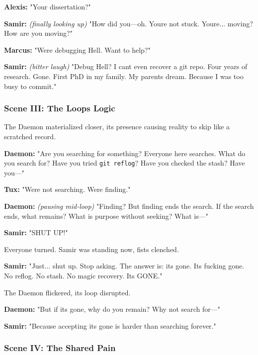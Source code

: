 \textbf{Alexis:} "Your dissertation?"

\textbf{Samir:} \emph{(finally looking up)} "How did you---oh. You\textquotesingle re not stuck. You\textquotesingle re... moving? How are you moving?"

\textbf{Marcus:} "We\textquotesingle re debugging Hell. Want to help?"

\textbf{Samir:} \emph{(bitter laugh)} "Debug Hell? I can\textquotesingle t even recover a git repo. Four years of research. Gone. First PhD in my family. My parents\textquotesingle{} dream. Because I was \textquotesingle too busy\textquotesingle{} to commit."

\bookdivider

\subsubsection{Scene III: The Loop\textquotesingle s Logic}\label{scene-iii-the-loops-logic}

The Daemon materialized closer, its presence causing reality to skip like a scratched record.

\textbf{Daemon:} "Are you searching for something? Everyone here searches. What do you search for? Have you tried \texttt{git\ reflog}? Have you checked the stash? Have you---"

\textbf{Tux:} "We\textquotesingle re not searching. We\textquotesingle re finding."

\textbf{Daemon:} \emph{(pausing mid-loop)} "Finding? But finding ends the search. If the search ends, what remains? What is purpose without seeking? What is---"

\textbf{Samir:} "SHUT UP!"

Everyone turned. Samir was standing now, fists clenched.

\textbf{Samir:} "Just... shut up. Stop asking. The answer is: it\textquotesingle s gone. It\textquotesingle s fucking gone. No reflog. No stash. No magic recovery. It\textquotesingle s GONE."

The Daemon flickered, its loop disrupted.

\textbf{Daemon:} "But if it\textquotesingle s gone, why do you remain? Why not search for---"

\textbf{Samir:} "Because accepting it\textquotesingle s gone is harder than searching forever."

\bookdivider

\subsubsection{Scene IV: The Shared Pain}\label{scene-iv-the-shared-pain}

